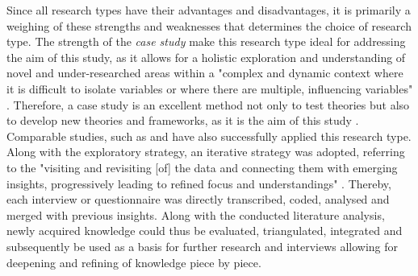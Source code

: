 Since all research types have their advantages and disadvantages, it is primarily a weighing of these strengths and weaknesses that determines the choice of research type. The strength of the \textit{case study} make this research type ideal for addressing the aim of this study, as it allows for a holistic exploration and understanding of novel and under-researched areas within a "complex and dynamic context where it is difficult to isolate variables or where there are multiple, influencing variables" \autocites[2]{fitzgeraldCaseStudiesResearch1999}. Therefore, a case study is an excellent method not only to test theories but also to develop new theories and frameworks, as it is the aim of this study \autocite{pelzResearchMethodsSocial, zainalCaseStudyResearch2007}. Comparable studies, such as \textcite{asiimweUseInnovativeAffordable2011,frigerioHandsOnExperienceCrowdsourcing2018,kohlitzRuralDrinkingWater2020,minkmanCitizenScienceWater2015} and \textcite{weeserCitizenSciencePioneers2018a} have also successfully applied this research type.\newline
Along with the exploratory strategy, an iterative strategy was adopted, referring to the "visiting and revisiting [of] the data and connecting them with emerging insights, progressively leading to refined focus and understandings" \autocite[77]{srivastavaPracticalIterativeFramework2009}. Thereby, each interview or questionnaire was directly transcribed, coded, analysed and merged with previous insights. Along with the conducted literature analysis, newly acquired knowledge could thus be evaluated, triangulated, integrated and subsequently be used as a basis for further research and interviews allowing for deepening and refining of knowledge piece by piece.

